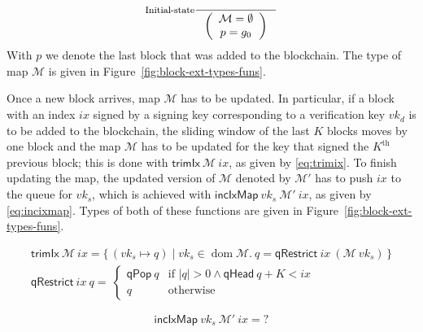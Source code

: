 \documentclass[11pt,a4paper]{article}
\DeclareMathOperator{\dom}{dom}
\newcommand\Set[2]{\{\,#1\mid#2\,\}}
\newcommand{\fun}[1]{\mathsf{#1}}
\newcommand{\size}[1]{\left| #1 \right|}
\newcommand{\signmapname}{\mathcal{M}}
\newcommand{\trimixname}{trimIx}
\newcommand{\incixmapname}{incIxMap}
\newcommand{\qrestrname}{qRestrict}
\newcommand{\qpopname}{qPop}
\newcommand{\qheadname}{qHead}
\newcommand{\signmap}[1]{\fun{\signmapname} ~ #1}
\newcommand{\qrestr}[2]{\fun{\qrestrname} ~ #1 ~ #2}
\newcommand{\trimix}[2]{\fun{\trimixname} ~ #1 ~ #2}
\newcommand{\incixmap}[3]{\fun{\incixmapname} ~ #1 ~ #2 ~ #3}
\newcommand{\qpop}[1]{\fun{\qpopname} ~ #1}
\newcommand{\qhead}[1]{\fun{\qheadname} ~ #1}
\newcommand{\partialf}{\mapsto}
\begin{document}
\begin{equation}
  \label{eq:init-bc-state}
  \inference[Initial-state]
  {}
  {\left(
      {\begin{array}{c}
        \signmapname = \emptyset \\
        p = g_0
      \end{array}}
  \right)
  }
\end{equation}
%
With $p$ we denote the last block that was added to the blockchain.
%
The type of map $\signmapname$ is given in
Figure~\ref{fig:block-ext-types-funs}.

Once a new block arrives, map $\signmapname$ has to be updated.
%
In particular, if a block with an index $ix$ signed by a signing key
corresponding to a verification key $vk_d$ is to be added to the blockchain,
the sliding window of the last $K$ blocks moves by one block and the map
$\signmapname$ has to be updated for the key that signed the $K^{\text{th}}$
previous block;
%
this is done with $\trimix{\signmapname}{ix}$, as given by
\eqref{eq:trimix}.
%
To finish updating the map, the updated version of $\signmapname$ denoted by
$\signmapname'$ has to push $ix$ to the queue for $vk_s$, which is achieved
with $\incixmap{vk_s}{\signmapname'}{ix}$, as given by
\eqref{eq:incixmap}.
%
Types of both of these functions are given in
Figure~\ref{fig:block-ext-types-funs}.


\begin{align}
  \label{eq:trimix}
  \trimix{\signmapname}{ix} = \Set{(vk_s \partialf q)}{vk_s \in \dom \signmapname.~
  q = \qrestr{ix}{(\signmap{vk_s}})} \\
  \qrestr{ix}{q} = \
  \begin{cases}
    \qpop{q} & \text{if } \size{q} > 0 \wedge \qhead{q} + K < ix \\
    q & \text{otherwise}
  \end{cases}
\end{align}

\begin{equation}
  \label{eq:incixmap}
  \incixmap{vk_s}{\signmapname'}{ix} = ?
\end{equation}
\end{document}
